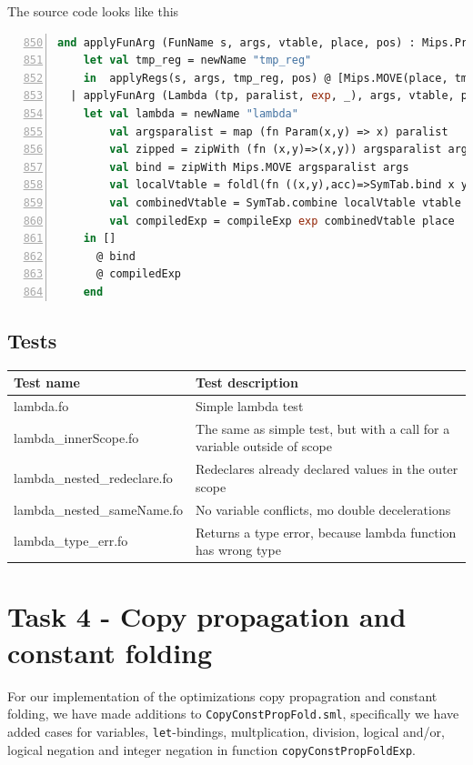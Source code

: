 \documentclass[11pt]{article}
\begin{document}
The source code looks like this
 \begin{lstlisting}[language=ML,basicstyle=\footnotesize,caption={Lambda in CodeGen.sml },firstnumber=850,breaklines=false,numbers=left]
and applyFunArg (FunName s, args, vtable, place, pos) : Mips.Prog =
    let val tmp_reg = newName "tmp_reg"
    in  applyRegs(s, args, tmp_reg, pos) @ [Mips.MOVE(place, tmp_reg)] end
  | applyFunArg (Lambda (tp, paralist, exp, _), args, vtable, place, pos) =
    let val lambda = newName "lambda"
        val argsparalist = map (fn Param(x,y) => x) paralist
        val zipped = zipWith (fn (x,y)=>(x,y)) argsparalist args 
        val bind = zipWith Mips.MOVE argsparalist args
        val localVtable = foldl(fn ((x,y),acc)=>SymTab.bind x y acc) (SymTab.empty()) zipped
        val combinedVtable = SymTab.combine localVtable vtable
        val compiledExp = compileExp exp combinedVtable place
    in []
      @ bind
      @ compiledExp
    end
\end{lstlisting}


\subsection{Tests}


    \begin{tabular}{|l|l|}
        \hline
        \textbf{Test name} & \textbf{Test description}                        \\
        \hline
        lambda.fo           & Simple lambda test    \\
        \hline
        lambda\_innerScope.fo        & The same as simple test, but with a call for a variable outside of scope     \\
        \hline
        lambda\_nested\_redeclare.fo   & Redeclares already declared values in the outer scope                           \\
        \hline
        lambda\_nested\_sameName.fo        & No variable conflicts, mo double decelerations       \\
        \hline
        lambda\_type\_err.fo     & Returns a type error, because lambda function has wrong type  \\
       
        \hline
    \end{tabular}








    \section{Task 4 - Copy propagation and constant folding}
	For our implementation of the optimizations copy propagration and constant
	folding, we have made additions to \texttt{CopyConstPropFold.sml}, specifically
	we have added cases for variables, \texttt{let}-bindings, multplication,
	division, logical and/or, logical negation and integer negation in function
	\texttt{copyConstPropFoldExp}.
\end{document}
